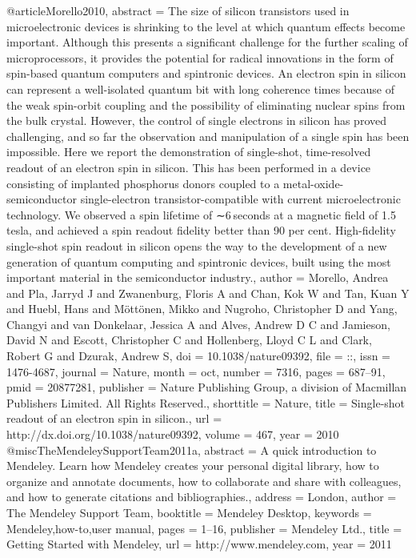 @article{Morello2010,
abstract = {The size of silicon transistors used in microelectronic devices is shrinking to the level at which quantum effects become important. Although this presents a significant challenge for the further scaling of microprocessors, it provides the potential for radical innovations in the form of spin-based quantum computers and spintronic devices. An electron spin in silicon can represent a well-isolated quantum bit with long coherence times because of the weak spin-orbit coupling and the possibility of eliminating nuclear spins from the bulk crystal. However, the control of single electrons in silicon has proved challenging, and so far the observation and manipulation of a single spin has been impossible. Here we report the demonstration of single-shot, time-resolved readout of an electron spin in silicon. This has been performed in a device consisting of implanted phosphorus donors coupled to a metal-oxide-semiconductor single-electron transistor-compatible with current microelectronic technology. We observed a spin lifetime of ∼6 seconds at a magnetic field of 1.5 tesla, and achieved a spin readout fidelity better than 90 per cent. High-fidelity single-shot spin readout in silicon opens the way to the development of a new generation of quantum computing and spintronic devices, built using the most important material in the semiconductor industry.},
author = {Morello, Andrea and Pla, Jarryd J and Zwanenburg, Floris A and Chan, Kok W and Tan, Kuan Y and Huebl, Hans and M{\"{o}}tt{\"{o}}nen, Mikko and Nugroho, Christopher D and Yang, Changyi and van Donkelaar, Jessica A and Alves, Andrew D C and Jamieson, David N and Escott, Christopher C and Hollenberg, Lloyd C L and Clark, Robert G and Dzurak, Andrew S},
doi = {10.1038/nature09392},
file = {::},
issn = {1476-4687},
journal = {Nature},
month = {oct},
number = {7316},
pages = {687--91},
pmid = {20877281},
publisher = {Nature Publishing Group, a division of Macmillan Publishers Limited. All Rights Reserved.},
shorttitle = {Nature},
title = {{Single-shot readout of an electron spin in silicon.}},
url = {http://dx.doi.org/10.1038/nature09392},
volume = {467},
year = {2010}
}
@misc{TheMendeleySupportTeam2011a,
abstract = {A quick introduction to Mendeley. Learn how Mendeley creates your personal digital library, how to organize and annotate documents, how to collaborate and share with colleagues, and how to generate citations and bibliographies.},
address = {London},
author = {{The Mendeley Support Team}},
booktitle = {Mendeley Desktop},
keywords = {Mendeley,how-to,user manual},
pages = {1--16},
publisher = {Mendeley Ltd.},
title = {{Getting Started with Mendeley}},
url = {http://www.mendeley.com},
year = {2011}
}
